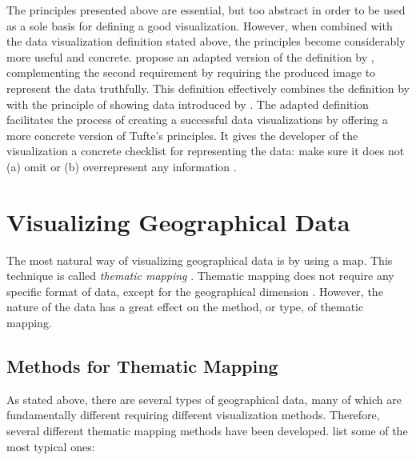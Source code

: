 The principles presented above are essential, but too abstract in order to be used as a sole basis for defining a good visualization. However, when combined with the data visualization definition stated above, the principles become considerably more useful and concrete. \citet{azzam_j-b_2013} propose an adapted version of the definition by \citet{kosara_visualization_2007}, complementing the second requirement by requiring the produced image to represent the data truthfully. This definition effectively combines the definition by \citet{kosara_visualization_2007} with the principle of showing data introduced by \citet{tufte_visual_1986}. The adapted definition facilitates the process of creating a successful data visualizations by offering a more concrete version of Tufte's principles. It gives the developer of the visualization a concrete checklist for representing the data: make sure it does not (a) omit or (b) overrepresent any information \citep{azzam_j-b_2013}.



\section{Visualizing Geographical Data}


The most natural way of visualizing geographical data is by using a map\citep[chap.~1]{kraak_cartographic_1998,kraak_cartography_2011}. This technique is called \emph{thematic mapping} \citep[chap.~1]{slocum_thematic_2014}. Thematic mapping does not require any specific format of data, except for the geographical dimension \citep[chap.~1]{kraak_cartography_2011}. However, the nature of the data has a great effect on the method, or type, of thematic mapping.

\subsection{Methods for Thematic Mapping}

As stated above, there are several types of geographical data, many of which are fundamentally different requiring different visualization methods. Therefore, several different thematic mapping methods have been developed. \citet[chap.~14-18]{slocum_thematic_2014} list some of the most typical ones: 

